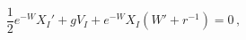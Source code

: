\begin{equation}
\frac 12 e^{-W} X_I' + g V_I + e^{-W} X_I (W' + r^{-1}) = 0\,, \label{flowk=0}
\end{equation}

